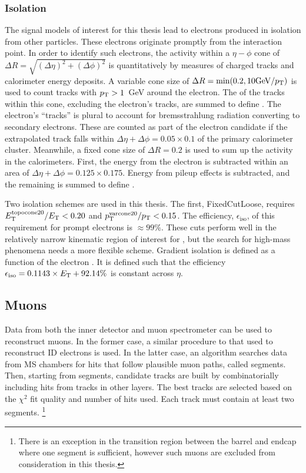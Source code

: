 \subsubsection{Isolation}
The signal models of interest for this thesis lead to electrons produced in isolation from other particles.
These electrons originate promptly from the interaction point.
In order to identify such electrons, the activity within a $\eta-\phi$ cone of $\Delta R=\sqrt{(\Delta\eta)^2+(\Delta\phi)^2}$ is quantitatively by measures of charged tracks and calorimeter energy deposits.
A variable cone size of $\Delta R=\text{min}(0.2,10\text{GeV}/p_\text{T})$ is used to count tracks with $p_\text{T}>1$~GeV around the electron. The \pt of the tracks within this cone, excluding the electron's tracks, are summed to define \ptvarconeElec.
The electron's ``tracks'' is plural to account for bremsstrahlung radiation converting to secondary electrons. 
These are counted as part of the electron candidate if the extrapolated track falls within $\Delta\eta+\Delta\phi=0.05\times0.1$ of the primary calorimeter cluster.
Meanwhile, a fixed cone size of $\Delta R=0.2$ is used to sum up the activity in the calorimeters.
First, the energy from the electron is subtracted within an area of $\Delta\eta+\Delta\phi=0.125\times0.175$.
Energy from pileup effects is subtracted, and the remaining \et is summed to define \etcone.

Two isolation schemes are used in this thesis.
The first, FixedCutLoose, requires $E_\text{T}^\text{topocone20}/E_\text{T}<0.20$ and $p_\text{T}^\text{varcone20}/p_\text{T}<0.15$.
The efficiency, $\epsilon_\text{iso}$, of this requirement for prompt electrons is $\approx99\%$.
These cuts perform well in the relatively narrow kinematic region of interest for \hmm, but the search for high-mass phenomena needs a more flexible scheme.
Gradient isolation is defined as a function of the electron \et.
It is defined such that the efficiency $\epsilon_\text{iso}=0.1143\times E_\text{T}+92.14\%$ is constant across $\eta$.
\cite{elecReco}



\subsection{Muons}

Data from both the inner detector and muon spectrometer can be used to reconstruct muons.
In the former case, a similar procedure to that used to reconstruct ID electrons is used.
In the latter case, an algorithm searches data from MS chambers for hits that follow plausible muon paths, called segments.
Then, starting from segments, candidate tracks are built by combinatorially including hits from tracks in other layers.
The best tracks are selected based on the $\chi^2$ fit quality and number of hits used.
Each track must contain at least two segments.
\footnote{There is an exception in the transition region between the barrel and endcap where one segment is sufficient, however such muons are excluded from consideration in this thesis.}

